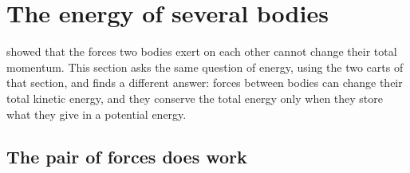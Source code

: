 \section{The energy of several bodies}
\label{sec:en-bodies}

 showed that the forces two bodies exert on each
other cannot change their total momentum. This section asks the same
question of energy, using the two carts of that section, and finds a
different answer: forces between bodies can change their total kinetic
energy, and they conserve the total energy only when they store what they
give in a potential energy.

\subsection*{The pair of forces does work}


